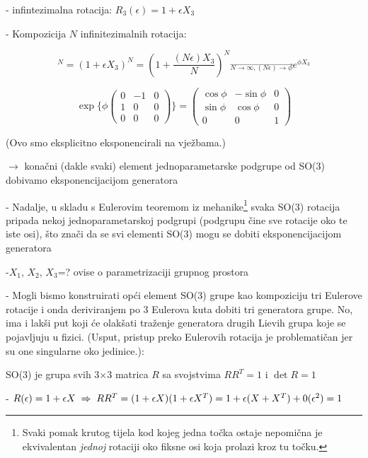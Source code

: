 - infintezimalna rotacija: $R_3 (\epsilon) = 1 + \epsilon X_3$

- Kompozicija $N$ infinitezimalnih rotacija:

\begin{displaymath}
[R_3(\epsilon)]^{N} = (1+\epsilon X_3)^N = \left(1+\frac{(N\epsilon)X_3}
 {N}\right)^N \stackrel{\longrightarrow}{_{N\to\infty, (N\epsilon)\to\phi}}
 e^{\phi X_3}
\end{displaymath}

\begin{displaymath}
\exp\Bigg\{ 
\phi  \left( \begin{array}{ccc}
0 & -1 & 0 \\
1 & 0 & 0 \\
0 & 0 & 0 
\end{array} \right)\Bigg\} =\left( 
\begin{array}{ccc}
\cos\phi & -\sin\phi & 0 \\
\sin\phi & \cos\phi & 0 \\
0 & 0 & 1 
\end{array}
\right)
\end{displaymath}

(Ovo smo eksplicitno eksponencirali na vježbama.)

$\to$ konačni (dakle svaki) element jednoparametarske podgrupe
od SO(3) dobivamo eksponencijacijom generatora 

- Nadalje, u skladu s Eulerovim teoremom iz mehanike\footnote{Svaki pomak krutog
tijela kod kojeg jedna točka ostaje nepomična je ekvivalentan \emph{jednoj}
rotaciji oko fiksne osi koja prolazi kroz tu točku.} svaka SO(3) rotacija 
pripada nekoj jednoparametarskoj podgrupi
 (podgrupu čine sve rotacije oko te iste osi), što znači da se
 svi elementi SO(3) mogu se dobiti eksponencijacijom generatora

-$X_1$, $X_2$, $X_3$=? \quad\textrm{ovise o parametrizaciji grupnog prostora}

- Mogli bismo konstruirati opći element SO(3) grupe kao kompoziciju tri
 Eulerove rotacije i onda deriviranjem po 3 Eulerova kuta dobiti tri
 generatora grupe. No, ima i lakši put koji će olakšati traženje 
 generatora drugih Lievih grupa koje se pojavljuju u fizici. 
 (Usput, pristup preko Eulerovih
 rotacija je problematičan jer su one singularne oko jedinice.):

SO(3) je grupa svih 3$\times$3 matrica $R$ sa svojstvima  
  $RR^{T}=1$ i $\det R=1$

- $R(\epsilon)=1+\epsilon X \;\Rightarrow\; RR^{T}=(1+\epsilon X)(1+\epsilon 
   X^{T}) = 1+\epsilon (X+X^{T})+0(\epsilon^2) = 1$

